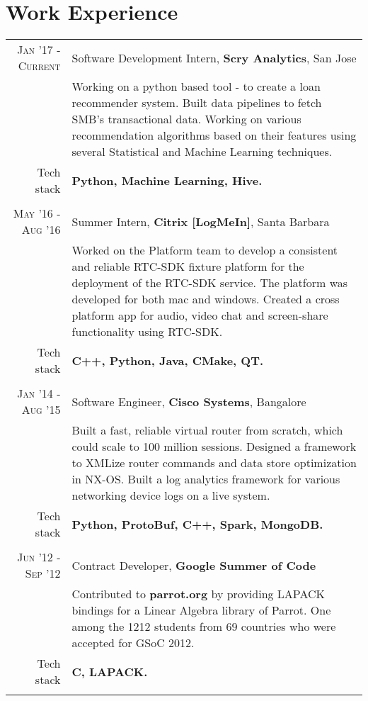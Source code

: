 \section{Work Experience}
\renewcommand{\arraystretch}{0.85}%
\begin{tabular}{r|p{14cm}}

\textsc{Jan '17 - Current} & Software Development Intern, \textbf{Scry Analytics}, San Jose\\
& \small{Working on a python based tool - to create a loan recommender system. Built data pipelines to fetch SMB's transactional data. Working on various recommendation algorithms based on their features using several Statistical and Machine Learning techniques.}\\
\small{Tech stack} &\footnotesize{\textbf{Python, Machine Learning, Hive.}} \\
\multicolumn{2}{c}{} \\

\textsc{May '16 - Aug '16} & Summer Intern, \textbf{Citrix [LogMeIn]}, Santa Barbara\\
& \small{Worked on the Platform team to develop a consistent and reliable RTC-SDK fixture platform for the deployment of the RTC-SDK service. 
The platform was developed for both mac and windows. 
Created a cross platform app for audio, video chat and screen-share functionality using RTC-SDK.}\\
\small{Tech stack} &\footnotesize{\textbf{C++, Python, Java, CMake, QT.}} \\
\multicolumn{2}{c}{} \\

\textsc{Jan '14 - Aug '15 } & Software Engineer, \textbf{Cisco Systems}, Bangalore \\
& \small{Built a fast, reliable virtual router from scratch, which could scale to 100 million sessions.	Designed a framework to XMLize router commands and data store optimization in NX-OS. Built a log analytics framework for various networking device logs on a live system.}\\
\small{Tech stack} &\footnotesize{\textbf{Python, ProtoBuf, C++, Spark, MongoDB.}} \\
\multicolumn{2}{c}{} \\

\textsc{Jun '12 - Sep '12} & Contract Developer, \textbf{Google Summer of Code}\\
& \small{Contributed to \textbf{parrot.org} by providing LAPACK bindings for a Linear Algebra library of Parrot. One among the 1212 students from 69 countries who were accepted for GSoC 2012.}\\
\small{Tech stack} &\footnotesize{\textbf{C, LAPACK.}}\\
\multicolumn{2}{c}{}


\end{tabular}
